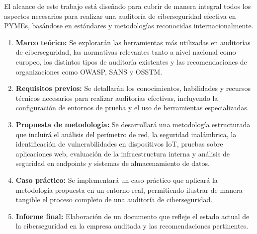 \documentclass[a4paper, 10pt]{article}
\begin{document}
El alcance de este trabajo está diseñado para cubrir de manera integral todos los aspectos necesarios para realizar una auditoría de ciberseguridad efectiva en PYMEs, basándose en estándares y metodologías reconocidas internacionalmente.

\begin{enumerate}
    \item \textbf{Marco teórico:} Se explorarán las herramientas más utilizadas en auditorías de ciberseguridad, las normativas relevantes tanto a nivel nacional como europeo, los distintos tipos de auditoría existentes y las recomendaciones de organizaciones como OWASP, SANS y OSSTM.
    
    \item \textbf{Requisitos previos:} Se detallarán los conocimientos, habilidades y recursos técnicos necesarios para realizar auditorías efectivas, incluyendo la configuración de entornos de prueba y el uso de herramientas especializadas.
        
    \item \textbf{Propuesta de metodología:} Se desarrollará una metodología estructurada que incluirá el análisis del perímetro de red, la seguridad inalámbrica, la identificación de vulnerabilidades en dispositivos IoT, pruebas sobre aplicaciones web, evaluación de la infraestructura interna y análisis de seguridad en endpoints y sistemas de almacenamiento de datos.
    
    \item \textbf{Caso práctico:} Se implementará un caso práctico que aplicará la metodología propuesta en un entorno real, permitiendo ilustrar de manera tangible el proceso completo de una auditoría de ciberseguridad.
    
    \item \textbf{Informe final:} Elaboración de un documento que refleje el estado actual de la ciberseguridad en la empresa auditada y las recomendaciones pertinentes.
\end{enumerate}
\end{document}
